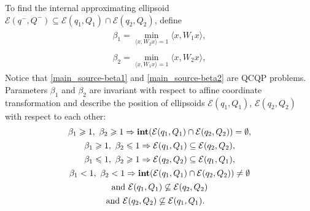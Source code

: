 \documentclass[letterpaper,10pt,english]{sphinxmanual}
\begin{document}
To find the internal approximating ellipsoid
${\mathcal E}(q^-,Q^-)\subseteq{\mathcal E}(q_1,Q_1)\cap{\mathcal E}(q_2,Q_2)$,
define
\label{main_source:equation-beta1}\begin{gather}
\begin{split}\beta_1 = \min_{\langle x,W_2x\rangle=1}\langle x,W_1x\rangle,\end{split}\label{main_source-beta1}
\end{gather}\label{main_source:equation-beta2}\begin{gather}
\begin{split}\beta_2 = \min_{\langle x,W_1x\rangle=1}\langle x,W_2x\rangle,\end{split}\label{main_source-beta2}
\end{gather}
Notice that \eqref{main_source-beta1} and \eqref{main_source-beta2} are QCQP problems. Parameters
$\beta_1$ and $\beta_2$ are invariant with respect to affine
coordinate transformation and describe the position of ellipsoids
${\mathcal E}(q_1,Q_1)$, ${\mathcal E}(q_2,Q_2)$ with
respect to each other:
\begin{gather}
\begin{split}\beta_1\geqslant1,~\beta_2\geqslant1 & \Rightarrow
{\bf int}({\mathcal E}(q_1,Q_1)\cap{\mathcal E}(q_2,Q_2))=\emptyset, \\\end{split}\notag\\\begin{split}\beta_1\geqslant1,~\beta_2\leqslant1 & \Rightarrow {\mathcal E}(q_1,Q_1)\subseteq{\mathcal E}(q_2,Q_2), \\\end{split}\notag\\\begin{split}\beta_1\leqslant1,~\beta_2\geqslant1 & \Rightarrow {\mathcal E}(q_2,Q_2)\subseteq{\mathcal E}(q_1,Q_1), \\\end{split}\notag\\\begin{split}\beta_1<1,~\beta_2<1 & \Rightarrow
{\bf int}({\mathcal E}(q_1,Q_1)\cap{\mathcal E}(q_2,Q_2))\neq\emptyset \\\end{split}\notag\\\begin{split}&\mbox{and} ~ {\mathcal E}(q_1,Q_1)\not\subseteq{\mathcal E}(q_2,Q_2) \\\end{split}\notag\\\begin{split}&\mbox{and} ~ {\mathcal E}(q_2,Q_2)\not\subseteq{\mathcal E}(q_1,Q_1).\end{split}\notag
\end{gather}
\end{document}

